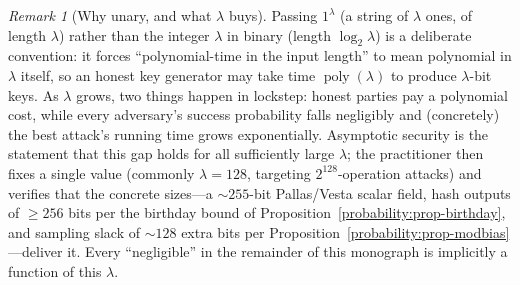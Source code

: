 \documentclass[11pt,a4paper]{article}
\theoremstyle{definition}
\theoremstyle{remark}
\newtheorem{remark}[theorem]{Remark}
\DeclareMathOperator{\poly}{poly}
\begin{document}
\begin{remark}[Why unary, and what \(\lambda\) buys]\label{probability:rem-unary}
Passing \(1^\lambda\) (a string of \(\lambda\) ones, of length \(\lambda\)) rather than the integer \(\lambda\) in binary (length \(\log_2\lambda\)) is a deliberate convention: it forces ``polynomial-time in the input length'' to mean polynomial in \(\lambda\) itself, so an honest key generator may take time \(\poly(\lambda)\) to produce \(\lambda\)-bit keys. As \(\lambda\) grows, two things happen in lockstep: honest parties pay a polynomial cost, while every adversary's success probability falls negligibly and (concretely) the best attack's running time grows exponentially. Asymptotic security is the statement that this gap holds for all sufficiently large \(\lambda\); the practitioner then fixes a single value (commonly \(\lambda = 128\), targeting \(2^{128}\)-operation attacks) and verifies that the concrete sizes---a \(\sim 255\)-bit Pallas/Vesta scalar field, hash outputs of \(\geq 256\) bits per the birthday bound of Proposition~\ref{probability:prop-birthday}, and sampling slack of \(\sim 128\) extra bits per Proposition~\ref{probability:prop-modbias}---deliver it. Every ``negligible'' in the remainder of this monograph is implicitly a function of this \(\lambda\).
\end{remark}
\end{document}
